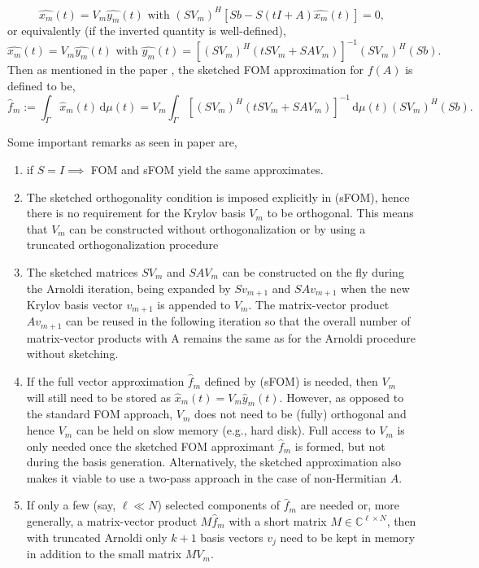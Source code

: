 \[
    \hat{x_m}(t) = V_m \hat{y_m}(t) \text{    with    } (SV_m)^{H}[Sb - S(tI + A)\hat{x_m}(t)] = 0,
\]
or equivalently (if the inverted quantity is well-defined), 
\begin{equation}
    \hat{x_m}(t) = V_m\hat{y_m}(t) \text{    with    } \hat{y_m}(t) = [(SV_m)^{H}(tSV_m + SAV_m)]^{-1}(SV_m)^{H}(Sb).
    \label{eq:2.28}
\end{equation}
Then as mentioned in the paper \cite{41}, the sketched FOM approximation for $f(A)$ is defined to be,
\[
    \hat{f}_m := \int_{\Gamma} \hat{x}_m(t) \, \mathrm{d}\mu(t) = V_m \int_{\Gamma} \left[(SV_m)^H (tSV_m + SAV_m)\right]^{-1} \, \mathrm{d}\mu(t) (SV_m)^H (Sb).
    \tag{\footnotesize sFOM}
\]

\begin{remark}
    \label{rem:2.17}
    Some important remarks as seen in paper \cite{41} are,
    \begin{enumerate}
        \item if $S = I \implies$ FOM and sFOM yield the same approximates.
        \item The sketched orthogonality condition is imposed explicitly in (sFOM), hence there is no requirement for the Krylov basis $V_m$ to be orthogonal. This means that $V_m$ can be constructed without orthogonalization or by using a truncated orthogonalization procedure
        \item The sketched matrices $SV_m$ and $SAV_m$ can be constructed on the fly during the Arnoldi iteration, being expanded by $Sv_{m+1}$ and $SAv_{m+1}$ when the new Krylov basis vector $v_{m+1}$ is appended to $V_{m}$. The matrix-vector product $Av_{m+1}$ can be reused in the following iteration so that the overall number of matrix-vector products with A remains the same as for the Arnoldi procedure without sketching.
        \item If the full vector approximation $\hat{f}_m$ defined by (sFOM) is needed, then $V_m$ will still need to be stored as $\hat{x}_m(t) = V_m\hat{y}_m(t)$. However, as opposed to the standard FOM approach, $V_m$ does not need to be (fully) orthogonal and hence $V_m$ can be held on slow memory (e.g., hard disk). Full access to $V_m$ is only needed once the sketched FOM approximant $\hat{f}_m$ is formed, but not during the basis generation. Alternatively, the sketched approximation also makes it viable to use a two-pass approach \cite{47, 48} in the case of non-Hermitian $A$.
        \item If only a few (say, $\ell \ll N$) selected components of $\hat{f}_m$ are needed or, more generally, a matrix-vector product $M\hat{f}_m$ with a short matrix $M \in \mathbb{C}^{\ell \times N}$, then with truncated Arnoldi only $k+1$ basis vectors $v_j$ need to be kept in memory in addition to the small matrix $MV_m$.
    \end{enumerate}   
\end{remark}

